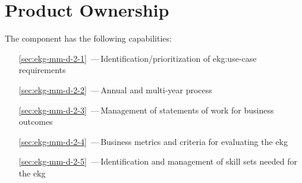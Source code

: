 \chapter{Product Ownership}\label{ch:ekg-mm-d-2}

The  component has the following capabilities:

\begin{itemize}[leftmargin=.5in]
  \item [\ref{sec:ekg-mm-d-2-1}] \,---\,Identification/prioritization of \gls{ekg:use-case} requirements
  \item [\ref{sec:ekg-mm-d-2-2}] \,---\,Annual and multi-year  process
  \item [\ref{sec:ekg-mm-d-2-3}] \,---\,Management of statements of work
  for business outcomes
  \item [\ref{sec:ekg-mm-d-2-4}] \,---\,Business metrics and criteria for evaluating the \gls{ekg}
  \item [\ref{sec:ekg-mm-d-2-5}] \,---\,Identification and management of skill sets
  needed for the \gls{ekg}
\end{itemize}






